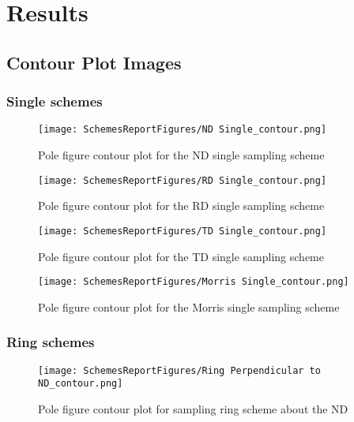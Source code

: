 \documentclass{article}
\begin{document}


\section{Results}



\subsection{Contour Plot Images}

\subsubsection{Single schemes}
\begin{figure}[ht]
    \centering
    \texttt{[image: SchemesReportFigures/ND Single\_contour.png]}
    \caption{Pole figure contour plot for the ND single sampling scheme}
\end{figure}

\begin{figure}[ht]
    \centering
    \texttt{[image: SchemesReportFigures/RD Single\_contour.png]}
    \caption{Pole figure contour plot for the RD single sampling scheme}
\end{figure}

\begin{figure}[ht]
    \centering
    \texttt{[image: SchemesReportFigures/TD Single\_contour.png]}
    \caption{Pole figure contour plot for the TD single sampling scheme}
\end{figure}




\begin{figure}[ht]
    \centering
    \texttt{[image: SchemesReportFigures/Morris Single\_contour.png]}
    \caption{Pole figure contour plot for the Morris single sampling scheme}
\end{figure}


\subsubsection{Ring schemes}
\begin{figure}[ht]
    \centering
    \texttt{[image: SchemesReportFigures/Ring Perpendicular to ND\_contour.png]}
    \caption{Pole figure contour plot for sampling ring scheme about the ND}
\end{figure}
\end{document}
